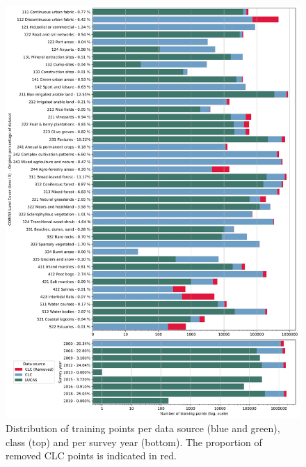     \begin{figure}[!hp]
    \centering
    \vspace*{-1.5cm}
        \hspace*{-3.5cm}
        \includegraphics[width=1.2\textwidth]{figs_03/methods_dataset_countplot.png}
    \caption{Distribution of training points per data source (blue and green), class (top) and per survey year (bottom). The proportion of removed CLC points is indicated in red.}
    \label{fig:dataset_countplot}
    \end{figure}
    

